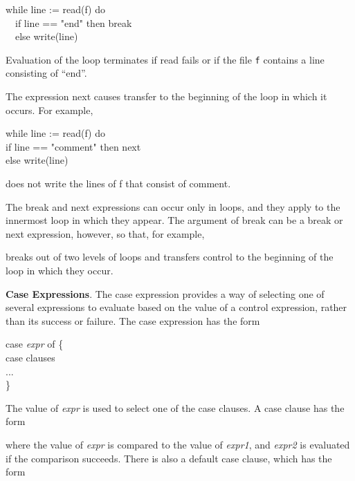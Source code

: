 \begin{iconcode}
\>while line := read(f) do\\
\>\ \ if line == "end" then break\\
\>\ \ else write(line)
\end{iconcode}

Evaluation of the loop terminates if read fails or if the file \texttt{f}
contains a line consisting of ``end''.

The expression next causes transfer to the beginning of the loop in
which it occurs. For example,

\begin{iconcode}
\> while line := read(f) do \\
\> \> if line == "comment" then next \\
\> \> else write(line)
\end{iconcode}

\noindent does not write the lines of f that consist of
{\textquotedbl}comment{\textquotedbl}.

The break and next expressions can occur only in loops, and they apply
to the innermost loop in which they appear. The argument of break can
be a break or next expression, however, so that, for example,


\noindent breaks out of two levels of loops and transfers control to
the beginning of the loop in which they occur.


\textbf{Case Expressions}. The case expression provides a way of
selecting one of several expressions to evaluate based on the value of
a control expression, rather than its success or failure. The case
expression has the form

\begin{iconcode}
\>case \textit{expr} of \{\\
\>\>case clauses \\
\>\>... \\
\>\>\}
\end{iconcode}

The value of \textit{expr} is used to select one of the case
clauses. A case clause has the form


\noindent where the value of \textit{expr} is compared to the value of
\textit{expr1}, and \textit{expr2} is evaluated if the comparison
succeeds. There is also a default case clause, which has the form

